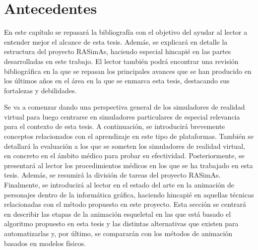 \chapter{Antecedentes} 

\label{cap:related}



En este capítulo se repasará la bibliografía con el objetivo del ayudar al lector a entender mejor el alcance de esta tesis.
Además, se explicará en detalle la estructura del proyecto \ac{RASimAs}, haciendo especial hincapié en las partes desarrolladas en este trabajo. El lector también podrá encontrar una revisión bibliográfica en la que se repasan los principales avances que se han producido en los últimos años en el área en la que se enmarca esta tesis, destacando sus fortalezas y debilidades. 

Se va a comenzar dando una perspectiva general de los simuladores de realidad virtual para luego centrarse en simuladores particulares de especial relevancia para el contexto de esta tesis. A continuación, se introducirá brevemente conceptos relacionados con el aprendizaje en este tipo de plataformas. También se detallará la evaluación a los que se someten los simuladores de realidad virtual, en concreto en el ámbito médico para probar su efectividad. Posteriormente, se presentará al lector los procedimientos médicos en los que se ha trabajado en esta tesis. Además, se resumirá la división de tareas del proyecto \ac{RASimAs}. 
Finalmente, se introducirá al lector en el estado del arte en la animación de personajes dentro de la informática gráfica, haciendo hincapié en aquellas técnicas relacionadas con el método propuesto en este proyecto. Esta sección se centrará en describir las etapas de la animación esqueletal en las que está basado el algoritmo propuesto en esta tesis y las distintas alternativas que existen para automatizarlas y, por último, se compararán con los métodos de animación basados en modelos físicos.


